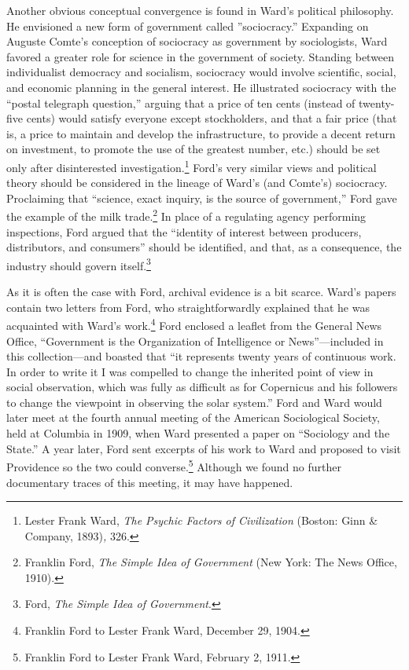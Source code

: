 \documentclass[openany,nobib]{tufte-book}
\begin{document}
Another obvious conceptual convergence is found in Ward's political
philosophy. He envisioned a new form of government called
''sociocracy.'' Expanding on Auguste Comte's conception of sociocracy as
government by sociologists, Ward favored a greater role for science in
the government of society. Standing between individualist democracy and
socialism, sociocracy would involve scientific, social, and economic
planning in the general interest. He illustrated sociocracy with the
``postal telegraph question,'' arguing that a price of ten cents
(instead of twenty-five cents) would satisfy everyone except
stockholders, and that a fair price (that is, a price to maintain and
develop the infrastructure, to provide a decent return on investment, to
promote the use of the greatest number, etc.) should be set only after
disinterested investigation.\footnote{Lester Frank Ward, \emph{The
  Psychic Factors of Civilization} (Boston: Ginn \& Company,
  1893)\emph{,} 326.} Ford's very similar views and political theory
should be considered in the lineage of Ward's (and Comte's) sociocracy.
Proclaiming that ``science, exact inquiry, is the source of
government,'' Ford gave the example of the milk trade.\footnote{Franklin
  Ford, \emph{The Simple Idea of Government} (New York: The News Office,
  1910).} In place of a regulating agency performing inspections, Ford
argued that the ``identity of interest between producers, distributors,
and consumers'' should be identified, and that, as a consequence, the
industry should govern itself.\footnote{Ford, \emph{The Simple Idea of
  Government}.}

As it is often the case with Ford, archival evidence is a bit scarce.
Ward's papers contain two letters from Ford, who straightforwardly
explained that he was acquainted with Ward's work.\footnote{Franklin
  Ford to Lester Frank Ward, December 29, 1904.} Ford enclosed a leaflet
from the General News Office, ``Government is the Organization of
Intelligence or News''---included in this collection---and boasted that
``it represents twenty years of continuous work. In order to write it I
was compelled to change the inherited point of view in social
observation, which was fully as difficult as for Copernicus and his
followers to change the viewpoint in observing the solar system.'' Ford
and Ward would later meet at the fourth annual meeting of the American
Sociological Society, held at Columbia in 1909, when Ward presented a
paper on ``Sociology and the State.'' A year later, Ford sent excerpts
of his work to Ward and proposed to visit Providence so the two could
converse.\footnote{Franklin Ford to Lester Frank Ward, February 2, 1911.}
Although we found no further documentary traces of this meeting, it may
have happened.
\end{document}
